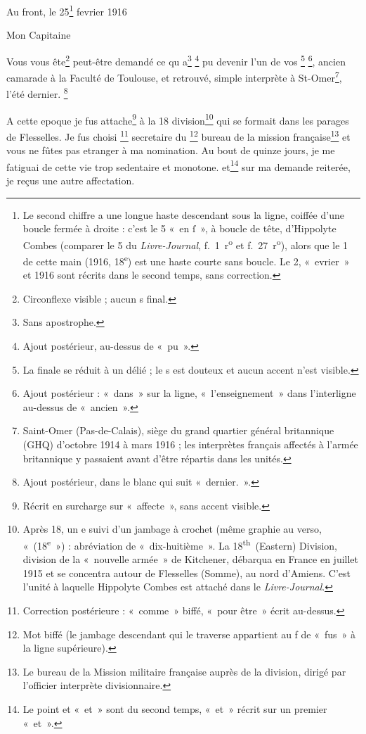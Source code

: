 \begin{LJlettre}
 \hfill Au front, le 25\footnote{Le second chiffre a une longue haste descendant sous la ligne, coiffée d'une boucle fermée à droite : c'est le 5 «~en ſ~», à boucle de tête, d'Hippolyte Combes (comparer le 5 du \textit{Livre-Journal}, f.~1~r\textsuperscript{o} et f.~27~r\textsuperscript{o}), alors que le 1 de cette main (1916, 18\textsuperscript{e}) est une haste courte sans boucle. Le 2, «~evrier~» et 1916 sont récrits dans le second temps, sans correction.} fevrier 1916

Mon Capitaine

Vous vous ête\footnote{Circonflexe visible ; aucun s final.} peut-être demandé ce qu a\footnote{Sans apostrophe.} \footnote{Ajout postérieur, au-dessus de «~pu~».} pu devenir l'un de vos \footnote{La finale se réduit à un délié ; le s est douteux et aucun accent n'est visible.} \footnote{Ajout postérieur : «~dans~» sur la ligne, «~l'enseignement~» dans l'interligne au-dessus de «~ancien~».}, ancien camarade à la Faculté de Toulouse, et retrouvé, simple interprète à St-Omer\footnote{Saint-Omer (Pas-de-Calais), siège du grand quartier général britannique (GHQ) d'octobre 1914 à mars 1916 ; les interprètes français affectés à l'armée britannique y passaient avant d'être répartis dans les unités.}, l'été dernier. \footnote{Ajout postérieur, dans le blanc qui suit «~dernier.~».}

A cette epoque je fus attache\footnote{Récrit en surcharge sur «~affecte~», sans accent visible.} à la 18 division\footnote{Après 18, un e suivi d'un jambage à crochet (même graphie au verso, «~(18\textsuperscript{e}~») : abréviation de «~dix-huitième~». La 18\textsuperscript{th}~(Eastern) Division, division de la «~nouvelle armée~» de Kitchener, débarqua en France en juillet 1915 et se concentra autour de Flesselles\label{annexe:doc1-flesselles} (Somme), au nord d'Amiens. C'est l'unité à laquelle Hippolyte Combes est attaché dans le \textit{Livre-Journal}.} qui se formait dans les parages de Flesselles. Je fus choisi  \footnote{Correction postérieure : «~comme~» biffé, «~pour être~» écrit au-dessus.} secretaire du \footnote{Mot biffé (le jambage descendant qui le traverse appartient au f de «~fus~» à la ligne supérieure).} bureau de la mission française\footnote{Le bureau de la Mission militaire française auprès de la division, dirigé par l'officier interprète divisionnaire.} et vous ne fûtes pas etranger à ma nomination. Au bout de quinze jours, je me fatiguai de cette vie trop sedentaire et monotone. et\footnote{Le point et «~et~» sont du second temps, «~et~» récrit sur un premier «~et~».} sur ma demande reiterée, je reçus une autre affectation.


\end{LJlettre}
